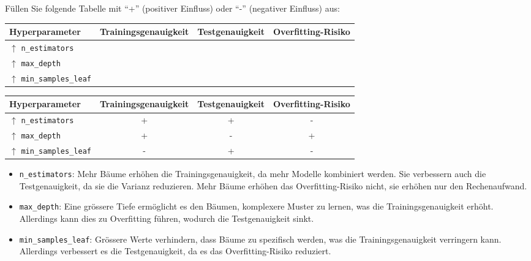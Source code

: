 \begin{myexercise}
    Füllen Sie folgende Tabelle mit \enquote{+} (positiver Einfluss) oder \enquote{-} (negativer Einfluss) aus:
    \begin{center}
        \begin{tabular}{lccc}
            Hyperparameter & Trainingsgenauigkeit & Testgenauigkeit & Overfitting-Risiko \\
            \midrule
            $\uparrow$ \texttt{n\_estimators} &  &  &  \\
            $\uparrow$ \texttt{max\_depth} &  &  &  \\
            $\uparrow$ \texttt{min\_samples\_leaf} &  &  &
        \end{tabular}
    \end{center}
    \begin{myanswer}
        \begin{center}
            \begin{tabular}{lccc}
                Hyperparameter & Trainingsgenauigkeit & Testgenauigkeit & Overfitting-Risiko \\
                \midrule
                $\uparrow$ \texttt{n\_estimators} & + & + & - \\
                $\uparrow$ \texttt{max\_depth} & + & - & + \\
                $\uparrow$ \texttt{min\_samples\_leaf} & - & + & -
            \end{tabular}
        \end{center}
        \begin{itemize}
            \item \texttt{n\_estimators}: Mehr Bäume erhöhen die Trainingsgenauigkeit, da mehr Modelle kombiniert werden. Sie verbessern auch die Testgenauigkeit, da sie die Varianz reduzieren. Mehr Bäume erhöhen das Overfitting-Risiko nicht, sie erhöhen nur den Rechenaufwand.
            \item \texttt{max\_depth}: Eine grössere Tiefe ermöglicht es den Bäumen, komplexere Muster zu lernen, was die Trainingsgenauigkeit erhöht. Allerdings kann dies zu Overfitting führen, wodurch die Testgenauigkeit sinkt.
            \item \texttt{min\_samples\_leaf}: Grössere Werte verhindern, dass Bäume zu spezifisch werden, was die Trainingsgenauigkeit verringern kann. Allerdings verbessert es die Testgenauigkeit, da es das Overfitting-Risiko reduziert.
        \end{itemize}
     \end{myanswer}
\end{myexercise}

